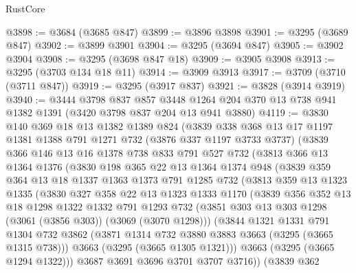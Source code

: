 \begin{lexlean}{RustCore}
\begin{coremodule}
@3898 := @3684 (@3685 @847)
@3899 := @3896 @3898
@3901 := @3295 (@3689 @847)
@3902 := @3899 @3901
@3904 := @3295 (@3694 @847)
@3905 := @3902 @3904
@3908 := @3295 (@3698 @847 @18)
@3909 := @3905 @3908
@3913 := @3295 (@3703 @134 @18 @11)
@3914 := @3909 @3913
@3917 := @3709 (@3710 (@3711 @847))
@3919 := @3295 (@3917 @837)
@3921 := @3828 (@3914 @3919)
@3940 := @3444
    @3798
    @837
    @857
    @3448
    @1264
    @204
    @370
    @13
    @738
    @941
    @1382
    @1391
    (@3420 @3798 @837 @204 @13 @941 @3880)
@4119 := @3830
    @140
    @369
    @18
    @13
    @1382
    @1389
    @824
    (@3839
      @338
      @368
      @13
      @17
      @1197
      @1381
      @1388
      @791
      @1271
      @732
      (@3876 @337 @1197 @3733 @3737)
      (@3839
        @366
        @146
        @13
        @16
        @1378
        @738
        @833
        @791
        @527
        @732
        (@3813
          @366
          @13
          @1364
          @1376
          (@3830
            @198
            @365
            @22
            @13
            @1364
            @1374
            @948
            (@3839
              @359
              @364
              @13
              @18
              @1337
              @1363
              @1373
              @791
              @1285
              @732
              (@3813
                @359
                @13
                @1323
                @1335
                (@3830
                  @327
                  @358
                  @22
                  @13
                  @1323
                  @1333
                  @1170
                  (@3839
                    @356
                    @352
                    @13
                    @18
                    @1298
                    @1322
                    @1332
                    @791
                    @1293
                    @732
                    (@3851 @303 @13 @303 @1298 (@3061 (@3856 @303)) (@3069 (@3070 @1298)))
                    (@3844
                      @1321
                      @1331
                      @791
                      @1304
                      @732
                      @3862
                      (@3871 @1314 @732 @3880 @3883 @3663 (@3295 (@3665 @1315 @738)))
                      @3663
                      (@3295 (@3665 @1305 @1321)))
                    @3663
                    (@3295 (@3665 @1294 @1322)))
                  @3687
                  @3691
                  @3696
                  @3701
                  @3707
                  @3716))
              (@3839
                @362

\end{coremodule}
\end{lexlean}

